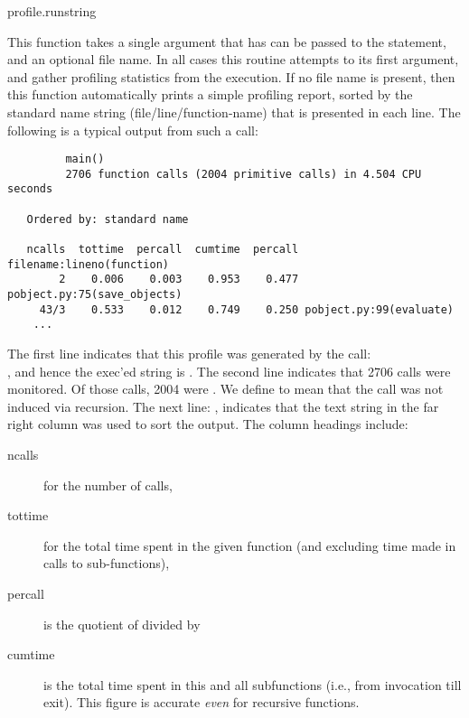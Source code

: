 \begin{funcdesc}{profile.run}{string}

This function takes a single argument that has can be passed to the
 statement, and an optional file name.  In all cases this
routine attempts to  its first argument, and gather profiling
statistics from the execution. If no file name is present, then this
function automatically prints a simple profiling report, sorted by the
standard name string (file/line/function-name) that is presented in
each line.  The following is a typical output from such a call:

\begin{verbatim}
         main()
         2706 function calls (2004 primitive calls) in 4.504 CPU seconds

   Ordered by: standard name

   ncalls  tottime  percall  cumtime  percall filename:lineno(function)
        2    0.006    0.003    0.953    0.477 pobject.py:75(save_objects)
     43/3    0.533    0.012    0.749    0.250 pobject.py:99(evaluate)
    ...
\end{verbatim}

The first line indicates that this profile was generated by the call:\\
, and hence the exec'ed string is
.  The second line indicates that 2706 calls were
monitored.  Of those calls, 2004 were .  We define
 to mean that the call was not induced via recursion.
The next line: , indicates that
the text string in the far right column was used to sort the output.
The column headings include:

\begin{description}

\item[ncalls ]
for the number of calls, 

\item[tottime ]
for the total time spent in the given function (and excluding time
made in calls to sub-functions),

\item[percall ]
is the quotient of  divided by 

\item[cumtime ]
is the total time spent in this and all subfunctions (i.e., from
invocation till exit). This figure is accurate \emph{even} for recursive
functions.


\end{description}
\end{funcdesc}
